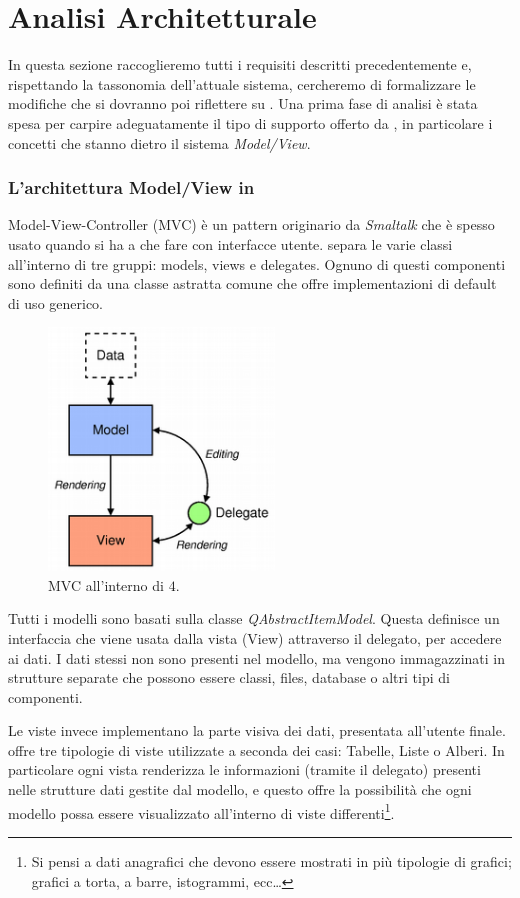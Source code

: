 \section{Analisi Architetturale}
In questa sezione raccoglieremo tutti i requisiti descritti precedentemente e, rispettando la tassonomia dell'attuale sistema, cercheremo di formalizzare le modifiche che si dovranno poi riflettere su \visualnetkit{}. Una prima fase di analisi è stata spesa per carpire adeguatamente il tipo di supporto offerto da \qt{}, in particolare i concetti che stanno dietro il sistema \emph{Model/View}.

\subsubsection*{L'architettura Model/View in \qt{}}
Model-View-Controller (MVC) è un pattern originario da \emph{Smaltalk} che è spesso usato quando si ha a che fare con interfacce utente. \qt{} separa le varie classi all'interno di tre gruppi: models, views e delegates. Ognuno di questi componenti sono definiti da una classe astratta comune che offre implementazioni di default di uso generico.

\begin{figure}[!htb]
	\centering
	\includegraphics[width=6cm]{images/modelview-overview.png}
	\caption{MVC all'interno di \qt{}$4$.}
	\label{figura:qt_mvc}
\end{figure}

Tutti i modelli sono basati sulla classe \emph{QAbstractItemModel}. Questa definisce un interfaccia che viene usata dalla vista (View) attraverso il delegato, per accedere ai dati. I dati stessi non sono presenti nel modello, ma vengono immagazzinati in strutture separate che possono essere classi, files, database o altri tipi di componenti.

Le viste invece implementano la parte visiva dei dati, presentata all'utente finale. \qt{} offre tre tipologie di viste utilizzate a seconda dei casi: Tabelle, Liste o Alberi. In particolare ogni vista renderizza le informazioni (tramite il delegato) presenti nelle strutture dati gestite dal modello, e questo offre la possibilità che ogni modello possa essere visualizzato all'interno di viste differenti\footnote{Si pensi a dati anagrafici che devono essere mostrati in più tipologie di grafici; grafici a torta, a barre, istogrammi, ecc\ldots}.

